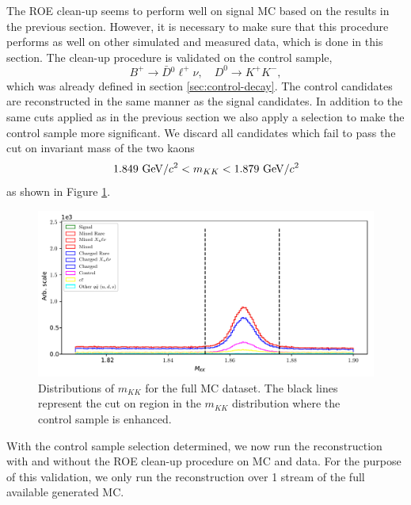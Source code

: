 The ROE clean-up seems to perform well on signal MC based on the results in the previous section. However, it is necessary to make sure that this procedure performs as well on other simulated and measured data, which is done in this section. The clean-up procedure is validated on the control sample, $$B^+ \to \bar D {}^0 \ell^+ \nu,\quad D^0 \to K^+K^-,$$
which was already defined in section \ref{sec:control-decay}. The control candidates are reconstructed in the same manner as the signal candidates. In addition to the same cuts applied as in the previous section we also apply a selection to make the control sample more significant. We discard all candidates which fail to pass the cut on invariant mass of the two kaons
\begin{equation}
1.849\mathrm{~GeV}/c^2 < m_{KK} < 1.879\mathrm{~GeV}/c^2
\end{equation}
as shown in Figure \ref{fig:roe_mKK}.
\begin{figure}[!htb]
	\centering
	\captionsetup{width=0.8\linewidth}
	\includegraphics[width=\linewidth]{fig/roe_mKK_cut}
	\caption{Distributions of $m_{KK}$ for the full MC dataset. The black lines represent the cut on region in the $m_{KK}$ distribution where the control sample is enhanced.}
	\label{fig:roe_mKK}
\end{figure}

With the control sample selection determined, we now run the reconstruction with and without the ROE clean-up procedure on MC and data. For the purpose of this validation, we only run the reconstruction over 1 stream of the full available generated MC. 

